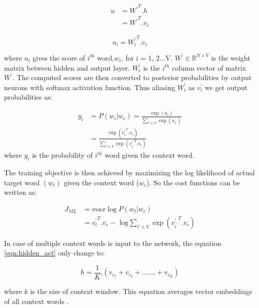 \begin{equation}
\begin{split}
         u &={W^{'}} ^ T . h \\
              &= {W^{'}}^T. v_{c}    
\end{split}
\end{equation}

\begin{equation}
    u_i = {W^{'}_i}^T. v_{c}
\end{equation}

\noindent  where $u_i$ gives the score of $i^{th}$ word,$w_{i}$, for i = 1, 2...V. $W^{'}{\in} \mathbb{R}^{N{\times}V} $ is the weight matrix between hidden and output layer. ${W^{'}_i}$ is the $i^{th}$ column vector of matrix $W^{'}$.  
The computed scores are then converted to posterior probabilities by output neurons with softmax activation function. Thus aliasing ${W^{'}_i}$ as $v^{'}_{i}$ we get output probabilities as: 

\begin{equation}
\begin{split}    
y_i &= P(w_i | w_c) = \frac {\exp(u_i)} {\sum_{i' {\in} V} \exp (u_{i^{'}})}\\
    &= \frac {\exp({v^{'}_{i}}^T.v_{c})}{\sum_{i' {\in} V}\exp({v^{'}_{i^{'}}}^T.v_{c})}
\end{split}
\end{equation}
where $y_i$ is the probability of $i^{th}$ word given the context word.

The training objective is then achieved by maximizing the log likelihood of actual target word $(w_{t})$ given the context word ($w_{c}$). So the cost functions can be written as:

\begin{equation}
  \begin{split}
      J_{ML} &= max \log P(w_t | w_c) \\
           &= {v^{'}_{t}}^T.v_{c}- \text{ log} \sum_{i' {\in} V} {\exp({v^{'}_{i^{'}}}^T.v_{c})}
  \end{split}
\end{equation} 

In case of multiple context words is input to the network, the equation \ref{eqn:hidden_act} only change to:

\begin{equation}
h= \frac {1}{K} .(v_{c_1}+v_{c_2}+.......+v_{c_K}) 
\end{equation}    

where $k$ is the size of context window. This equation averages vector embeddings of all context words \cite{w2v:parameter_learning}.

